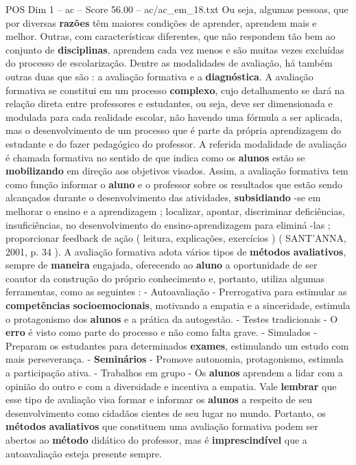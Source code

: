 \begin{textsample}{POS Dim 1 – ac – Score 56.00 – ac/ac\_em\_18.txt}
Ou seja, algumas pessoas, que por diversas \textbf{razões} têm maiores condições de aprender, aprendem mais e melhor.
Outras, com características diferentes, que não respondem tão bem ao conjunto de \textbf{disciplinas}, aprendem cada vez menos e são muitas vezes excluídas do processo de escolarização.
Dentre as modalidades de avaliação, há também outras duas que são : a avaliação formativa e a \textbf{diagnóstica}.
A avaliação formativa se constitui em um processo \textbf{complexo}, cujo detalhamento se dará na relação direta entre professores e estudantes, ou seja, deve ser dimensionada e modulada para cada realidade escolar, não havendo uma fórmula a ser aplicada, mas o desenvolvimento de um processo que é parte da própria aprendizagem do estudante e do fazer pedagógico do professor.
A referida modalidade de avaliação é chamada formativa no sentido de que indica como os \textbf{alunos} estão se \textbf{mobilizando} em direção aos objetivos visados.
Assim, a avaliação formativa tem como função informar o \textbf{aluno} e o professor sobre os resultados que estão sendo alcançados durante o desenvolvimento das atividades, \textbf{subsidiando} -se em melhorar o ensino e a aprendizagem ; localizar, apontar, discriminar deficiências, insuficiências, no desenvolvimento do ensino-aprendizagem para eliminá -las ; proporcionar feedback de ação ( leitura, explicações, exercícios ) ( SANT’ANNA, 2001, p. 34 ).
A avaliação formativa adota vários tipos de \textbf{métodos} \textbf{avaliativos}, sempre de \textbf{maneira} engajada, oferecendo ao \textbf{aluno} a oportunidade de ser coautor da construção do próprio conhecimento e, portanto, utiliza algumas ferramentas, como as seguintes : - Autoavaliação - Prerrogativa para estimular as \textbf{competências} \textbf{socioemocionais}, motivando a empatia e a sinceridade, estimula o protagonismo dos \textbf{alunos} e a prática da autogestão. - Testes tradicionais - O \textbf{erro} é visto como parte do processo e não como falta grave. - Simulados - Preparam os estudantes para determinados \textbf{exames}, estimulando um estudo com mais perseverança. - \textbf{Seminários} - Promove autonomia, protagonismo, estimula a participação ativa. - Trabalhos em grupo - Os \textbf{alunos} aprendem a lidar com a opinião do outro e com a diversidade e incentiva a empatia.
Vale \textbf{lembrar} que esse tipo de avaliação visa formar e informar os \textbf{alunos} a respeito de seu desenvolvimento como cidadãos cientes de seu lugar no mundo.
Portanto, os \textbf{métodos} \textbf{avaliativos} que constituem uma avaliação formativa podem ser abertos ao \textbf{método} didático do professor, mas é \textbf{imprescindível} que a autoavaliação esteja presente sempre.

\end{textsample}
